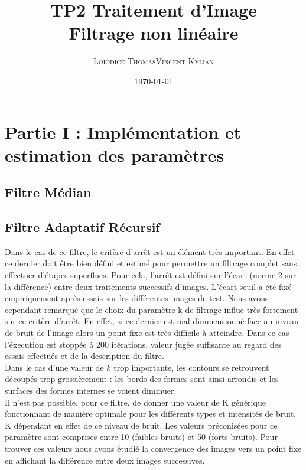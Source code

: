 \documentclass[a4,12pt]{article}
\title{\textbf{TP2 Traitement d'Image\\Filtrage non linéaire}}
\author{
\begin{tabular}{cc}
	\textsc{Loiodice Thomas} & \textsc{Vincent Kylian} \\
\end{tabular}}
\date{\small \today}
\begin{document}
\maketitle



\section{Partie I : Implémentation et estimation des paramètres}
\subsection{Filtre Médian}

\subsection{Filtre Adaptatif Récursif}
Dans le cas de ce filtre, le critère d'arrêt est un élément très important. En effet ce dernier doit être bien défini et estimé pour permettre un filtrage complet sans effectuer d'étapes superflues. Pour cela, l'arrêt est défini sur l'écart (norme 2 sur la différence) entre deux traitements successifs d'images. L'écart seuil a été fixé empiriquement après essais sur les différentes images de test. Nous avons cependant remarqué que le choix du paramètre k de filtrage influe très fortement sur ce critère d'arrêt. En effet, si ce dernier est mal dimmensionné face au niveau de bruit de l'image alors un point fixe est très difficile à atteindre. Dans ce cas l'éxecution est stoppée à 200 itérations, valeur jugée suffisante au regard des essais effectués et de la description du filtre.\\

Dans le cas d'une valeur de $k$ trop importante, les contours se retrouvent découpés trop grossièrement : les bords des formes sont ainsi arrondis et les surfaces des formes internes se voient diminuer.\\

Il n'est pas possible, pour ce filtre, de donner une valeur de K générique fonctionnant de manière optimale pour les différents types et intensités de bruit, K dépendant en effet de ce niveau de bruit. Les valeurs préconisées pour ce paramètre sont comprises entre  10 (faibles bruits) et 50 (forts bruits). Pour trouver ces valeurs nous avons étudié la convergence des images vers un point fixe en affichant la différence entre deux images successives.
\end{document}
